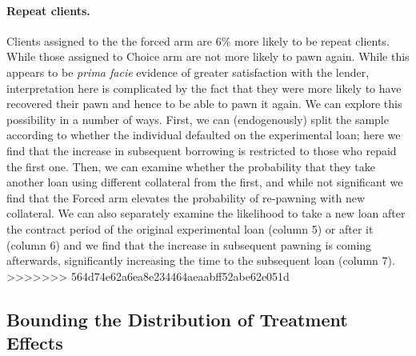 \documentclass[oneside,11pt]{article}
\begin{document}
\paragraph{Repeat clients.} 
Clients assigned to the the forced arm are 6\% more likely to be repeat clients. While those assigned to Choice arm are not more likely to pawn again. While this appears to be \textit{prima facie} evidence of greater satisfaction with the lender, interpretation here is complicated by the fact that they were more likely to have recovered their pawn and hence to be able to pawn it again.  We can explore this possibility in a number of ways.  First, we can (endogenously) split the sample according to whether the individual defaulted on the experimental loan; here we find that the increase in subsequent borrowing is restricted to those who repaid the first one.  Then, we can examine whether the probability that they take another loan using different collateral from the first, and while not significant we find that the Forced arm elevates the probability of re-pawning with new collateral.  We can also separately examine the likelihood to take a new loan after the contract period of the original experimental loan (column 5) or after it (column 6) and we find that the increase in subsequent pawning is coming afterwards, significantly increasing the time to the subsequent loan (column 7).  
>>>>>>> 564d74e62a6ea8e234464aeaabff52abe62e051d



\subsection{Bounding the Distribution of Treatment Effects}
\end{document}
